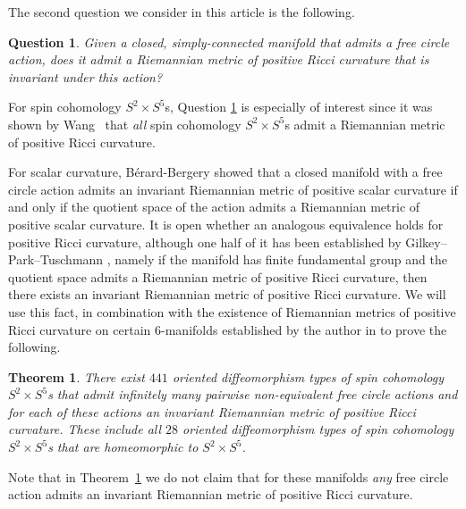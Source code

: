 \documentclass[10pt,a4paper]{amsart}
\numberwithin{equation}{section}
\newtheorem{theoremAlph}{Theorem}
\newtheorem{Question}[Theorem]{Question}
\theoremstyle{definition}
\numberwithin{table}{section}
\begin{document}
The second question we consider in this article is the following.
\begin{Question}\label{Q:free_circ_Ric}
	Given a closed, simply-connected manifold that admits a free circle action, does it admit a Riemannian metric of positive Ricci curvature that is invariant under this action?
\end{Question}

For spin cohomology $S^2\times S^5$s, Question \ref{Q:free_circ_Ric} is especially of interest since it was shown by Wang~\cite{Wa22} that \emph{all} spin cohomology $S^2\times S^5$s admit a Riemannian metric of positive Ricci curvature.

For scalar curvature, B\'erard-Bergery \cite{BB83} showed that a closed manifold with a free circle action admits an invariant Riemannian metric of positive scalar curvature if and only if the quotient space of the action admits a Riemannian metric of positive scalar curvature. It is open whether an analogous equivalence holds for positive Ricci curvature, although one half of it has been established by Gilkey--Park--Tuschmann \cite{GPT98}, namely if the manifold has finite fundamental group and the quotient space admits a Riemannian metric of positive Ricci curvature, then there exists an invariant Riemannian metric of positive Ricci curvature. We will use this fact, in combination with the existence of Riemannian metrics of positive Ricci curvature on certain $6$-manifolds established by the author in \cite{Re24b} to prove the following.	
\begin{theoremAlph}\label{T:Ric>0}
	There exist $441$ oriented diffeomorphism types of spin cohomology $S^2\times S^5$s that admit infinitely many pairwise non-equivalent free circle actions and for each of these actions an invariant Riemannian metric of positive Ricci curvature. These include all $28$ oriented diffeomorphism types of spin cohomology $S^2\times S^5$s that are homeomorphic to $S^2\times S^5$.
\end{theoremAlph}

Note that in Theorem~\ref{T:Ric>0} we do not claim that for these manifolds \emph{any} free circle action admits an invariant Riemannian metric of positive Ricci curvature.
\end{document}
